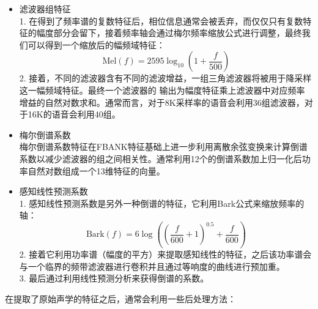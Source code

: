 \begin{itemize}
    \item 滤波器组特征 \\
    1. 在得到了频率谱的复数特征后，相位信息通常会被丢弃，而仅仅只有复数特征的幅度部分会留下，接着频率轴会通过梅尔频率缩放公式进行调整，最终我们可以得到一个缩放后的幅频域特征：
    \begin{equation}
        \text{Mel}(f)=2595 \log_{10}(1+\frac{f}{500}) 
    \end{equation}
    2. 接着，不同的滤波器含有不同的滤波增益，一组三角滤波器将被用于降采样这一幅频域特征。最终一个滤波器的 输出为幅度特征乘上滤波器中对应频率增益的自然对数求和。通常而言，对于8K采样率的语音会利用36组滤波器，对于16K的语音会利用40组。
    \item 梅尔倒谱系数 \\
    梅尔倒谱系数特征在FBANK特征基础上进一步利用离散余弦变换来计算倒谱系数以减少滤波器的组之间相关性。通常利用12个的倒谱系数加上归一化后功率自然对数组成一个13维特征的向量。
    \item 感知线性预测系数 \\
    1. 感知线性预测系数是另外一种倒谱的特征，它利用Bark公式来缩放频率的轴：
    \begin{equation}
        \text{Bark}(f)=6\log \left( \left( \frac{f}{600}+1 \right)^{0.5}+\frac{f}{600} \right)
    \end{equation}
    2. 接着它利用功率谱（幅度的平方）来提取感知线性的特征，之后该功率谱会与一个临界的频带滤波器进行卷积并且通过等响度的曲线进行预加重。\\
    3. 最后通过利用线性预测分析来获得倒谱的系数。
\end{itemize}
在提取了原始声学的特征之后，通常会利用一些后处理方法：
